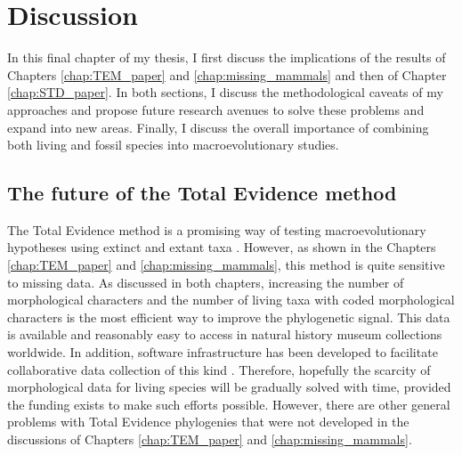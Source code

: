 \chapter{Discussion}
\label{chap:discussion}

%
%

In this final chapter of my thesis, I first discuss the implications of the results of Chapters \ref{chap:TEM_paper} and \ref{chap:missing_mammals} and then of Chapter \ref{chap:STD_paper}.
In both sections, I discuss the methodological caveats of my approaches and propose future research avenues to solve these problems and expand into new areas.
Finally, I discuss the overall importance of combining both living and fossil species into macroevolutionary studies.

\section{The future of the Total Evidence method}
The Total Evidence method is a promising way of testing macroevolutionary hypotheses using extinct and extant taxa \citep[e.g.][]{ronquista2012,slaterphylogenetic2013,Wood01032013,beckancient2014,Dembo2015}.
However, as shown in the Chapters \ref{chap:TEM_paper} and \ref{chap:missing_mammals}, this method is quite sensitive to missing data.
As discussed in both chapters, increasing the number of morphological characters and the number of living taxa with coded morphological characters is the most efficient way to improve the phylogenetic signal. %
This data is available and reasonably easy to access in natural history museum collections worldwide. 
In addition, software infrastructure has been developed to facilitate collaborative data collection of this kind \citep{morphobank}.
Therefore, hopefully the scarcity of morphological data for living species will be gradually solved with time, provided the funding exists to make such efforts possible.
However, there are other general problems with Total Evidence phylogenies that were not developed in the discussions of Chapters \ref{chap:TEM_paper} and \ref{chap:missing_mammals}. 


